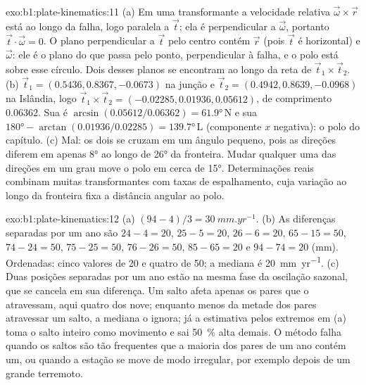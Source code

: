\begin{solution}{exo:b1:plate-kinematics:11}
(a) Em uma transformante a velocidade relativa $\vec\omega\times\vec r$ está ao longo da
falha, logo paralela a $\vec t$; ela é perpendicular a $\vec\omega$, portanto
$\vec t\cdot\vec\omega = 0$. O plano perpendicular a $\vec t$ pelo
centro contém $\vec r$ (pois $\vec t$ é horizontal) e $\vec\omega$: ele
é o plano do  que passa pelo ponto, perpendicular à falha,
e o polo está sobre esse círculo. Dois desses planos se encontram ao longo da reta de
$\vec t_1\times\vec t_2$. (b) $\vec t_1 = (0.5436, 0.8367, -0.0673)$ na
junção e $\vec t_2 = (0.4942, 0.8639, -0.0968)$ na Islândia, logo
$\vec t_1\times\vec t_2 = (-0.02285, 0.01936, 0.05612)$, de comprimento $0.06362$.
Sua  é $\arcsin(0.05612/0.06362) = \ang{61.9}$\,N e sua 
$\ang{180} - \arctan(0.01936/0.02285) = \ang{139.7}$\,L (componente $x$ negativa):
o polo do capítulo. (c) Mal: os dois  se cruzam em um ângulo pequeno,
pois as direções diferem em apenas \ang{8} ao longo de \ang{26} da fronteira.
Mudar qualquer uma das direções em um grau move o polo em cerca de \ang{15}. Determinações
reais combinam muitas transformantes com taxas de espalhamento, cuja variação
ao longo da fronteira fixa a distância angular ao polo.
\end{solution}

\begin{solution}{exo:b1:plate-kinematics:12}
(a) $(94 - 4)/3 = \qty{30}{mm.yr^{-1}}$. (b) As diferenças separadas por um ano são
$24 - 4 = 20$, $25 - 5 = 20$, $26 - 6 = 20$, $65 - 15 = 50$, $74 - 24 = 50$,
$75 - 25 = 50$, $76 - 26 = 50$, $85 - 65 = 20$ e $94 - 74 = 20$ (mm). Ordenadas:
cinco valores de 20 e quatro de 50; a mediana é \qty{20}{mm.yr^{-1}}. (c) Duas
posições separadas por um ano estão na mesma fase da oscilação sazonal, que se cancela em sua diferença. Um salto afeta apenas os pares que o atravessam, aqui quatro dos nove; enquanto menos da metade dos pares atravessar um salto, a mediana o ignora; já a estimativa
pelos extremos em (a) toma o salto inteiro como movimento e sai \qty{50}{\percent} alta demais. O método falha quando os saltos são tão frequentes que a maioria dos pares de um ano contém um, ou quando a estação se move de modo irregular, por exemplo depois de um grande terremoto.
\end{solution}

